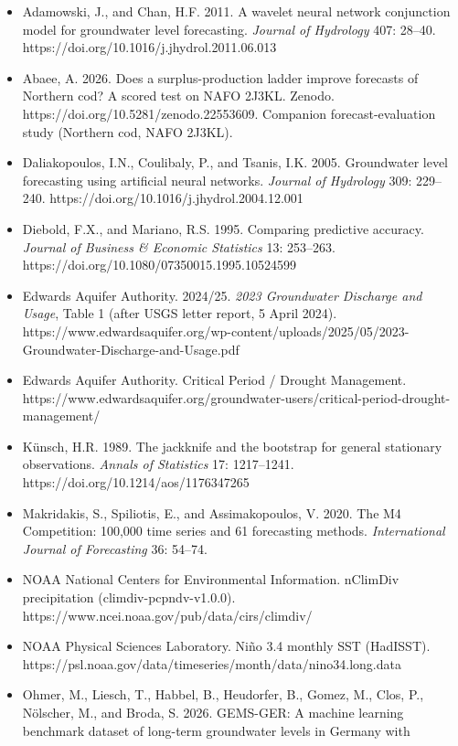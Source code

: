 \documentclass[11pt]{article}
\begin{document}
\begin{itemize}
\item
  Adamowski, J., and Chan, H.F. 2011. A wavelet neural network
  conjunction model for groundwater level forecasting. \emph{Journal of
  Hydrology} 407: 28--40. https://doi.org/10.1016/j.jhydrol.2011.06.013
\item
  Abaee, A. 2026. Does a surplus-production ladder improve forecasts of
  Northern cod? A scored test on NAFO 2J3KL. Zenodo.
  https://doi.org/10.5281/zenodo.22553609. Companion forecast-evaluation
  study (Northern cod, NAFO 2J3KL).
\item
  Daliakopoulos, I.N., Coulibaly, P., and Tsanis, I.K. 2005. Groundwater
  level forecasting using artificial neural networks. \emph{Journal of
  Hydrology} 309: 229--240.
  https://doi.org/10.1016/j.jhydrol.2004.12.001
\item
  Diebold, F.X., and Mariano, R.S. 1995. Comparing predictive accuracy.
  \emph{Journal of Business \& Economic Statistics} 13: 253--263.
  https://doi.org/10.1080/07350015.1995.10524599
\item
  Edwards Aquifer Authority. 2024/25. \emph{2023 Groundwater Discharge
  and Usage}, Table 1 (after USGS letter report, 5 April 2024).
  https://www.edwardsaquifer.org/wp-content/uploads/2025/05/2023-Groundwater-Discharge-and-Usage.pdf
\item
  Edwards Aquifer Authority. Critical Period / Drought Management.
  https://www.edwardsaquifer.org/groundwater-users/critical-period-drought-management/
\item
  Künsch, H.R. 1989. The jackknife and the bootstrap for general
  stationary observations. \emph{Annals of Statistics} 17: 1217--1241.
  https://doi.org/10.1214/aos/1176347265
\item
  Makridakis, S., Spiliotis, E., and Assimakopoulos, V. 2020. The M4
  Competition: 100,000 time series and 61 forecasting methods.
  \emph{International Journal of Forecasting} 36: 54--74.
\item
  NOAA National Centers for Environmental Information. nClimDiv
  precipitation (climdiv-pcpndv-v1.0.0).
  https://www.ncei.noaa.gov/pub/data/cirs/climdiv/
\item
  NOAA Physical Sciences Laboratory. Niño 3.4 monthly SST (HadISST).
  https://psl.noaa.gov/data/timeseries/month/data/nino34.long.data
\item
  Ohmer, M., Liesch, T., Habbel, B., Heudorfer, B., Gomez, M., Clos, P.,
  Nölscher, M., and Broda, S. 2026. GEMS-GER: A machine learning
  benchmark dataset of long-term groundwater levels in Germany with

\end{itemize}
\end{document}
